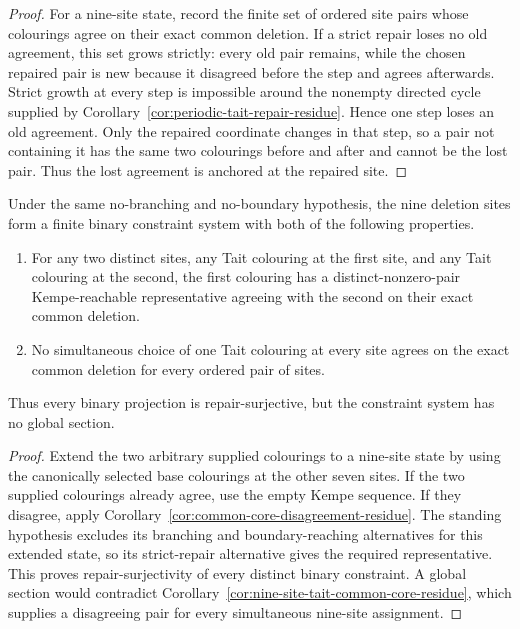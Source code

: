 \begin{proof}
For a nine-site state, record the finite set of ordered site pairs whose
colourings agree on their exact common deletion.  If a strict repair loses
no old agreement, this set grows strictly: every old pair remains, while the
chosen repaired pair is new because it disagreed before the step and agrees
afterwards.  Strict growth at every step is impossible around the nonempty
directed cycle supplied by
Corollary~\ref{cor:periodic-tait-repair-residue}.  Hence one step loses an old
agreement.  Only the repaired coordinate changes in that step, so a pair
not containing it has the same two colourings before and after and cannot be
the lost pair.  Thus the lost agreement is anchored at the repaired site.
\end{proof}

\begin{corollary}
\label{cor:arc-consistent-no-section-residue}
Under the same no-branching and no-boundary hypothesis, the nine deletion
sites form a finite binary constraint system with both of the following
properties.
\begin{enumerate}
\item For any two distinct sites, any Tait colouring at the first site, and
      any Tait colouring at the second, the first colouring has a
      distinct-nonzero-pair Kempe-reachable representative agreeing with the
      second on their exact common deletion.
\item No simultaneous choice of one Tait colouring at every site agrees on
      the exact common deletion for every ordered pair of sites.
\end{enumerate}
Thus every binary projection is repair-surjective, but the constraint system
has no global section.
\end{corollary}

\begin{proof}
Extend the two arbitrary supplied colourings to a nine-site state by using
the canonically selected base colourings at the other seven sites.  If the
two supplied colourings already agree, use the empty Kempe sequence.  If
they disagree, apply
Corollary~\ref{cor:common-core-disagreement-residue}.  The standing
hypothesis excludes its branching and boundary-reaching alternatives for
this extended state, so its strict-repair alternative gives the required
representative.  This proves repair-surjectivity of every distinct binary
constraint.  A global section would contradict
Corollary~\ref{cor:nine-site-tait-common-core-residue}, which supplies a
disagreeing pair for every simultaneous nine-site assignment.
\end{proof}

